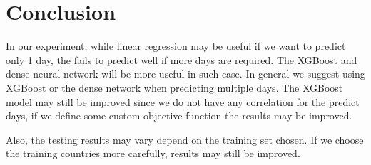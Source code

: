 \documentclass[a4paper,12pt]{article}
\begin{document}
\section{Conclusion}
In our experiment, while linear regression may be useful if we want to predict only 1 day, the fails to predict well if more days are required. The XGBoost and dense neural network will be more useful in such case. In general we suggest using XGBoost or the dense network when predicting multiple days. The XGBoost model may still be improved since we do not have any correlation for the predict days, if we define some custom objective function the results may be improved.

Also, the testing results may vary depend on the training set chosen. If we choose the training countries more carefully, results may still be improved.  
\end{document}
